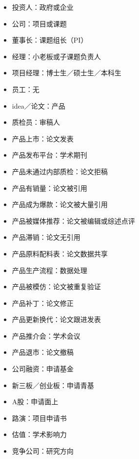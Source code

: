 \documentclass[]{tufte-book}
\providecommand{\tightlist}{%
  \setlength{\itemsep}{0pt}\setlength{\parskip}{0pt}}
\begin{document}
\begin{itemize}
\tightlist
\item
  投资人：政府或企业
\item
  公司：项目或课题
\item
  董事长：课题组长（PI）
\item
  经理：小老板或子课题负责人
\item
  项目经理：博士生／硕士生／本科生
\item
  员工：无
\item
  idea／论文：产品
\item
  质检员：审稿人
\item
  产品上市：论文发表
\item
  产品发布平台：学术期刊
\item
  产品未通过内部质检：论文拒稿
\item
  产品有销量：论文被引用
\item
  产品成为爆款：论文被大量引用
\item
  产品被媒体推荐：论文被编辑或综述点评
\item
  产品滞销：论文无引用
\item
  产品原料配料表：论文数据共享
\item
  产品生产流程：数据处理
\item
  产品被模仿：论文被重复验证
\item
  产品补丁：论文修正
\item
  产品更新换代：论文跟进发表
\item
  产品推介会：学术会议
\item
  产品退市：论文撤稿
\item
  公司融资：申请基金
\item
  新三板／创业板：申请青基
\item
  A股：申请面上
\item
  路演：项目申请书
\item
  估值：学术影响力
\item
  竞争公司：研究方向
\end{itemize}
\end{document}
